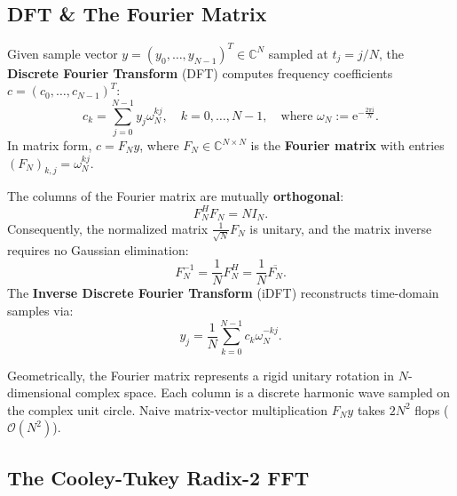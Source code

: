 \subsection{DFT \& The Fourier Matrix}

\begin{definition}
    Given sample vector $y = (y_0, \dots, y_{N-1})^T \in \mathbb{C}^N$ sampled at $t_j = j/N$, the \textbf{Discrete Fourier Transform} (DFT) computes frequency coefficients $c = (c_0, \dots, c_{N-1})^T$:
    \begin{equation}
        c_k = \sum_{j=0}^{N-1} y_j \omega_N^{k j}, \quad k = 0, \dots, N-1, \quad \text{where } \omega_N := \mathrm{e}^{-\frac{2\pi \mathrm{i}}{N}}.
    \end{equation}
    In matrix form, $c = F_N y$, where $F_N \in \mathbb{C}^{N \times N}$ is the \textbf{Fourier matrix} with entries $(F_N)_{k,j} = \omega_N^{k j}$.
\end{definition}

\begin{theorem}
    The columns of the Fourier matrix are mutually \textbf{orthogonal}:
    \begin{equation}
        F_N^H F_N = N I_N.
    \end{equation}
    Consequently, the normalized matrix $\frac{1}{\sqrt{N}} F_N$ is unitary, and the matrix inverse requires no Gaussian elimination:
    \begin{equation}
        F_N^{-1} = \frac{1}{N} F_N^H = \frac{1}{N} \overline{F_N}.
    \end{equation}
    The \textbf{Inverse Discrete Fourier Transform} (iDFT) reconstructs time-domain samples via:
    \begin{equation}
        y_j = \frac{1}{N} \sum_{k=0}^{N-1} c_k \omega_N^{-k j}.
    \end{equation}
\end{theorem}

Geometrically, the Fourier matrix represents a rigid unitary rotation in $N$-dimensional complex space. Each column is a discrete harmonic wave sampled on the complex unit circle. Naive matrix-vector multiplication $F_N y$ takes $2N^2$ flops ($\mathcal{O}(N^2)$).

\subsection{The Cooley-Tukey Radix-2 FFT}


